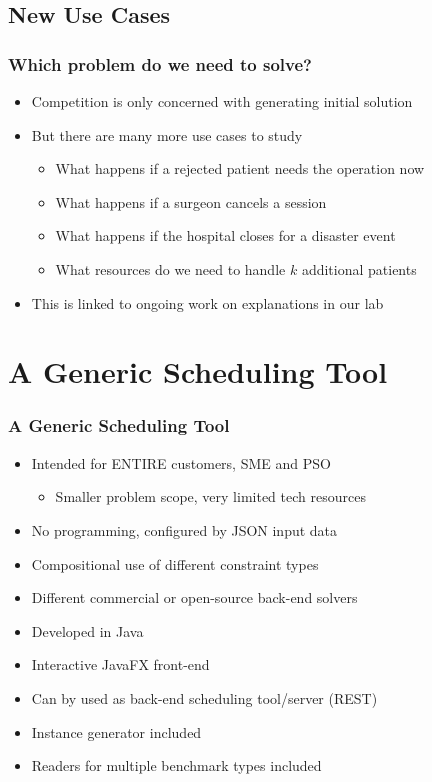 
\subsection{New Use Cases}

\begin{frame}
\frametitle{Which problem do we need to solve?}
\begin{itemize}
\item Competition is only concerned with generating initial solution
\item But there are many more use cases to study
\begin{itemize}
\item What happens if a rejected patient needs the operation now
\item What happens if a surgeon cancels a session
\item What happens if the hospital closes for a disaster event
\item What resources do we need to handle $k$ additional patients
\end{itemize}
\item This is linked to ongoing work on explanations in our lab
\end{itemize}
\end{frame}



\section{A Generic Scheduling Tool}

\begin{frame}
\frametitle{A Generic Scheduling Tool}
\begin{itemize}
\item Intended for ENTIRE customers, SME and PSO
\begin{itemize}
\item Smaller problem scope, very limited tech resources
\end{itemize}
\item No programming, configured by JSON input data
\item Compositional use of different constraint types
\item Different commercial or open-source back-end solvers
\item Developed in Java
\item Interactive JavaFX front-end
\item Can by used as back-end scheduling tool/server (REST)
\item Instance generator included
\item Readers for multiple benchmark types included
\end{itemize}
\end{frame}

